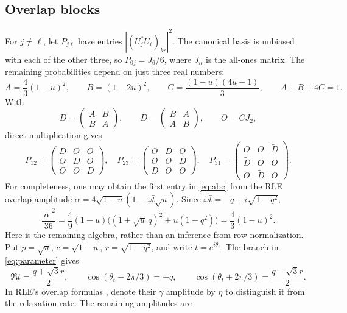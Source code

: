 \documentclass[11pt,a4paper]{article}
\theoremstyle{remark}
\begin{document}
\subsection{Overlap blocks}
For $j\ne\ell$, let $P_{j\ell}$ have entries $|(U_j^*U_\ell)_{kr}|^2$. The canonical basis is unbiased with each of the other three, so $P_{0j}=J_6/6$, where $J_n$ is the all-ones matrix.
The remaining probabilities depend on just three real numbers:
\begin{equation}\label{eq:abc}
 A=\frac43(1-u)^2,\qquad B=(1-2u)^2,\qquad
 C=\frac{(1-u)(4u-1)}3,\qquad A+B+4C=1.
\end{equation}
With
\[
 D=\begin{pmatrix}A&B\\B&A\end{pmatrix},\qquad
 \widetilde D=\begin{pmatrix}B&A\\A&B\end{pmatrix},\qquad O=CJ_2,
\]
direct multiplication gives
\begin{equation}\label{eq:blocks}
 P_{12}=\begin{pmatrix}D&O&O\\O&D&O\\O&O&D\end{pmatrix},\quad
 P_{23}=\begin{pmatrix}O&D&O\\O&O&D\\D&O&O\end{pmatrix},\quad
 P_{31}=\begin{pmatrix}O&O&\widetilde D\\\widetilde D&O&O\\O&\widetilde D&O\end{pmatrix}.
\end{equation}
For completeness, one may obtain the first entry in \eqref{eq:abc} from the RLE overlap amplitude $\alpha=4\sqrt{1-u}(1-\omega\bar t\sqrt u)$. Since $\omega\bar t=-q+i\sqrt{1-q^2}$,
\[
 \frac{|\alpha|^2}{36}
 =\frac49(1-u)\bigl((1+\sqrt u\,q)^2+u(1-q^2)\bigr)
 =\frac43(1-u)^2.
\]
Here is the remaining algebra, rather than an inference from row normalization. Put $p=\sqrt u$, $c=\sqrt{1-u}$, $r=\sqrt{1-q^2}$, and write $t=e^{i\theta_t}$. The branch in \eqref{eq:parameter} gives
\[
 \Re t=\frac{q+\sqrt3r}{2},\qquad
 \cos(\theta_t-2\pi/3)=-q,\qquad
 \cos(\theta_t+2\pi/3)=\frac{q-\sqrt3r}{2}.
\]
In RLE's overlap formulas \cite[Eqs.~(8)--(12)]{rle}, denote their $\gamma$ amplitude by $\eta$ to distinguish it from the relaxation rate. The remaining amplitudes are
\end{document}

